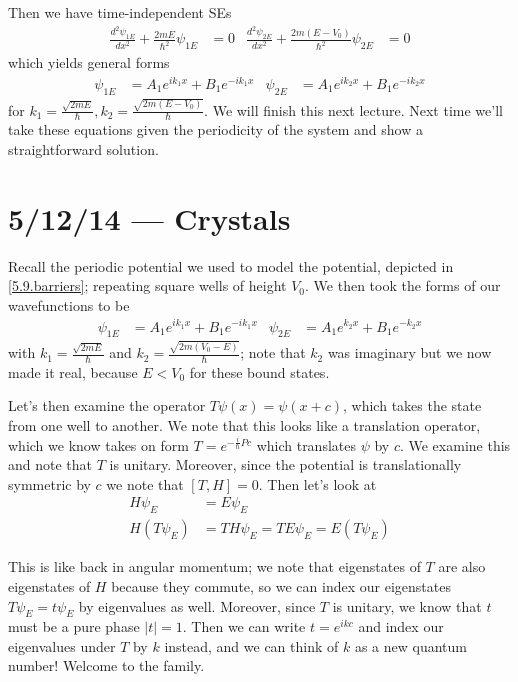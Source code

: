 \documentclass[10pt]{report}
\newcommand{\abs}[1]{\left|#1\right|}
\newcommand{\rtd}[2]{\frac{d^2#1}{d#2^2}}
\begin{document}
Then we have time-independent SEs
\begin{align}
    \rtd{\psi_{1E}}{x} + \frac{2mE}{\hbar^2}\psi_{1E} &= 0 & \rtd{\psi_{2E}}{x} + \frac{2m(E - V_0)}{\hbar^2}\psi_{2E} &= 0
\end{align}
which yields general forms
\begin{align}
    \psi_{1E} &= A_1e^{ik_1x} + B_1e^{-ik_1x} & \psi_{2E} &= A_1e^{ik_2x} + B_1e^{-ik_2x}
\end{align}
for $k_1 = \frac{\sqrt{2mE}}{\hbar}, k_2 = \frac{\sqrt{2m(E-V_0)}}{\hbar}$. We will finish this next lecture. Next time we'll take these equations given the periodicity of the system and show a straightforward solution. 

\chapter{5/12/14 --- Crystals}

Recall the periodic potential we used to model the potential, depicted in \ref{5.9.barriers}; repeating square wells of height $V_0$. We then took the forms of our wavefunctions to be
\begin{align}
    \psi_{1E} &= A_1e^{ik_1x} + B_1e^{-ik_1x} & \psi_{2E} &= A_1e^{k_2x} + B_1e^{-k_2x}\label{5.12.eigens}
\end{align}
with $k_1 = \frac{\sqrt{2mE}}{\hbar}$ and $k_2 = \frac{\sqrt{2m(V_0 - E)}}{\hbar}$; note that $k_2$ was imaginary but we now made it real, because $E < V_0$ for these bound states.

Let's then examine the operator $T\psi(x) = \psi(x+c)$, which takes the state from one well to another. We note that this looks like a translation operator, which we know takes on form $T = e^{-\frac{i}{\hbar}Pc}$ which translates $\psi$ by $c$. We examine this and note that $T$ is unitary. Moreover, since the potential is translationally symmetric by $c$ we note that $[T,H] = 0$. Then let's look at
\begin{align}
    H \psi_E &= E\psi_E\\
    H(T\psi_E) &= TH\psi_E = TE\psi_E = E(T\psi_E)
\end{align}

This is like back in angular momentum; we note that eigenstates of $T$ are also eigenstates of $H$ because they commute, so we can index our eigenstates $T\psi_E = t\psi_E$ by eigenvalues as well. Moreover, since $T$ is unitary, we know that $t$ must be a pure phase $\abs{t} = 1$. Then we can write $t = e^{ikc}$ and index our eigenvalues under $T$ by $k$ instead, and we can think of $k$ as a new quantum number! Welcome to the family.
\end{document}
